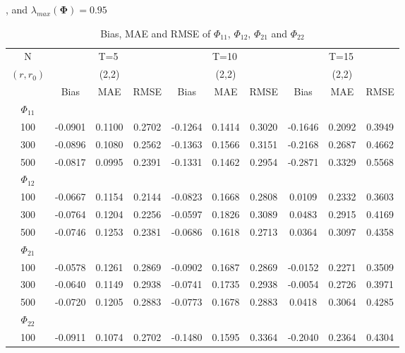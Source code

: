 \documentclass[12pt,a4paper,hyperref]{article}
\begin{document}
\begin{table}[H]
\caption{Bias, MAE and RMSE of $\Phi_{11}$, $\Phi_{12}$, $\Phi_{21}$ and $\Phi_{22}$}, and $\lambda_{max}(\boldsymbol{\Phi})=0.95$    \label{table1}
\centering
\tabcolsep=0.11cm
\begin{threeparttable}
\begin{tabular} {*{10}{c}}
\toprule
N& \multicolumn{3}{c}{T=5}&\multicolumn{3}{c}{T=10}&\multicolumn{3}{c}{T=15}\\
\cmidrule(lr){1-10}
$(r,r_{0})$ &   &(2,2)  &  &   &(2,2)  & &  &(2,2) & \\
\cmidrule(lr){1-4} \cmidrule(lr){5-7}\cmidrule(lr){8-10}
& \multicolumn{1}{c}{Bias} &\multicolumn{1}{c}{MAE}& \multicolumn{1}{c}{RMSE}&\multicolumn{1}{c}{Bias} &\multicolumn{1}{c}{MAE}& \multicolumn{1}{c}{RMSE}&\multicolumn{1}{c}{Bias}&\multicolumn{1}{c}{MAE} & \multicolumn{1}{c}{RMSE}\\
  \cmidrule(lr){2-4} \cmidrule(lr){5-7} \cmidrule(lr){8-10}
 $\Phi_{11}$\\
\cmidrule(lr){1-10}
 100& -0.0901 &0.1100 & 0.2702&	-0.1264 &	0.1414&0.3020&-0.1646&0.2092& 0.3949 \\
300&  -0.0896& 0.1080 & 0.2562&	-0.1363&	0.1566&0.3151& -0.2168& 0.2687& 0.4662\\
500& -0.0817& 0.0995& 0.2391  &-0.1331&	0.1462&0.2954& -0.2871&0.3329&	0.5568  \\
\cmidrule(lr){1-10}
$\Phi_{12}$\\
\cmidrule(lr){1-4}   \cmidrule(lr){5-7}   \cmidrule(lr){8-10}
  100& -0.0667&0.1154& 0.2144&	-0.0823 &	0.1668& 0.2808& 0.0109& 0.2332& 0.3603  \\
300& -0.0764&0.1204& 0.2256&-0.0597  &	0.1826&	0.3089&0.0483 &0.2915&0.4169 \\
500& -0.0746&0.1253 & 0.2381&	-0.0686&	0.1618&0.2713 &0.0364&0.3097&0.4358	  \\
\cmidrule(lr){1-10}
$\Phi_{21}$\\
\cmidrule(lr){1-4}   \cmidrule(lr){5-7}   \cmidrule(lr){8-10}
 100& -0.0578 &0.1261 &0.2869&	-0.0902 &	0.1687&0.2869& -0.0152&0.2271&0.3509 \\
300&-0.0640  & 0.1149 & 0.2938&	 -0.0741 &0.1735&0.2938	&-0.0054& 0.2726& 0.3971\\
500& -0.0720&0.1205  & 0.2883  &-0.0773  &	0.1678& 0.2883&0.0418 & 0.3064&	0.4285  \\
\cmidrule(lr){1-10}
$\Phi_{22}$\\
\cmidrule(lr){1-4}   \cmidrule(lr){5-7}   \cmidrule(lr){8-10}
 100& -0.0911 &0.1074& 0.2702&	-0.1480 &0.1595& 0.3364& -0.2040&0.2364 & 0.4304\\

\end{tabular}
\end{threeparttable}
\end{table}
\end{document}
